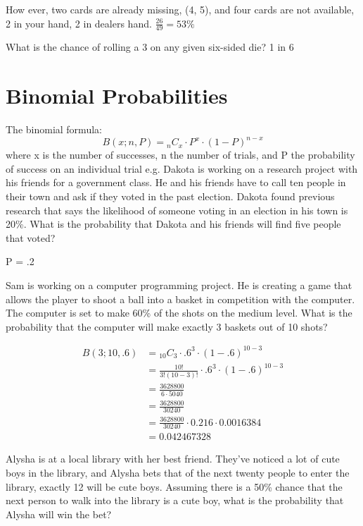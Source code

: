 \documentclass{article}
\newcommand*{\Comb}[2]{{}_{#1}C_{#2}}%
\newcommand*{\RComb}[2]{\frac{#1!}{#2!(#1-#2)!}}%
\newcommand*{\Binom}[3]{B(#1; #2, #3) & = \Comb{#2}{#1} \cdot {#3}^{#1} \cdot (1-{#3})^{{#2}-{#1}}}%
\newcommand*{\RBinom}[3]{& = \RComb{#2}{#1} \cdot {#3}^{#1} \cdot (1-#3)^{{#2}-{#1}} \\}%
\begin{document}
How ever, two cards are already missing, (4, 5), and four cards are not available, 2 in your hand, 2 in dealers hand. 
$\frac{26}{49} = 53\%$ 

What is the chance of rolling a 3 on any given six-sided die?
1 in 6

\section{Binomial Probabilities}
The binomial formula: 
\begin{equation}
B(x; n, P) = \Comb{n}{x} \cdot P^x \cdot (1-P)^{n-x}
\end{equation}
where x is the number of successes, n the number of trials, and P the probability of success on an individual trial e.g. Dakota is working on a research project with his friends for a government class. He and his friends have to call ten people in their town and ask if they voted in the past election. Dakota found previous research that says the likelihood of someone voting in an election in his town is 20\%. What is the probability that Dakota and his friends will find five people that voted?


P = .2

Sam is working on a computer programming project. He is creating a game that allows the player to shoot a ball into a basket in competition with the computer. The computer is set to make 60\% of the shots on the medium level. What is the probability that the computer will make exactly 3 baskets out of 10 shots?

\begin{equation}
\begin{split}
\Binom{3}{10}{.6} \\
\RBinom{3}{10}{.6}
& = \frac{3628800}{6 \cdot 5040} \\
& = \frac{3628800}{30240} \\
& = \frac{3628800}{30240} \cdot 0.216 \cdot 0.0016384 \\
& = 0.042467328
\end{split}
\end{equation}

Alysha is at a local library with her best friend. They've noticed a lot of cute boys in the library, and Alysha bets that of the next twenty people to enter the library, exactly 12 will be cute boys. Assuming there is a 50\% chance that the next person to walk into the library is a cute boy, what is the probability that Alysha will win the bet?
\end{document}
